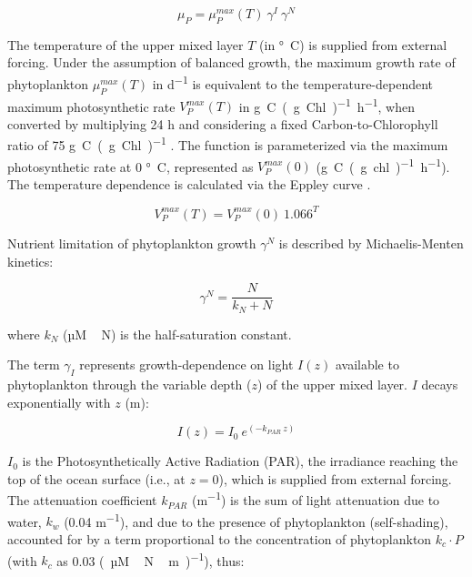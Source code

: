 \documentclass[gmd, manuscript]{copernicus}
\begin{document}
\begin{equation}
    \mu_{P} = \mu_P^{max}(T) \ \gamma^{I} \ \gamma^{N}
\end{equation}

The temperature of the upper mixed layer $T$ (in \unit{\degree C}) is supplied from external forcing. Under the assumption of balanced growth, the maximum growth rate of phytoplankton $\mu_P^{max}(T)$ in \unit{d^{−1}} is equivalent to the temperature-dependent maximum photosynthetic rate $V_P^{max}(T)$ in \unit{g C (g Chl)^{-1} h^{-1}}, when converted by multiplying 24 \unit{h} and considering a fixed Carbon-to-Chlorophyll ratio of 75 \unit{g C (g Chl)^{-1}} \citep{Sathyendranath2009Carbon-to-chlorophyllSea}. The function is parameterized via the maximum photosynthetic rate at 0 \unit{\degree C}, represented as $V_P^{max}(0)$ (\unit{g C (g chl)^{-1} h^{-1}}). The temperature dependence is calculated via the Eppley curve \citep{Eppley1972TemperatureSea}.

\begin{equation}
    V_P^{max}(T) = V_P^{max}(0) \ 1.066^T
\end{equation}

Nutrient limitation of phytoplankton growth $\gamma^N$ is described by Michaelis-Menten kinetics:

\begin{equation}
    \gamma^N = \frac{N}{k_N + N}
\end{equation}

where $k_N$ (\unit{µM\,N}) is the half-saturation constant.

The term $\gamma_{I}$ represents growth-dependence on light $I(z)$ available to phytoplankton through the variable depth ($z$) of the upper mixed layer. $I$ decays exponentially with $z$ (\unit{m}):

\begin{equation}
    I(z) = I_{0} \ e^{(-k_{PAR} \ z)}
\label{EQ:lightatt}
\end{equation}

$I_{0}$ is the Photosynthetically Active Radiation (PAR), the irradiance reaching the top of the ocean surface (i.e., at $z=0$), which is supplied from external forcing. The attenuation coefficient $k_{PAR}$ (\unit{m^{-1}}) is the sum of light attenuation due to water, $k_w$ (0.04 \unit{m^{-1}}), and due to the presence of phytoplankton (self-shading), accounted for by a term proportional to the concentration of phytoplankton $k_c \cdot P$ (with $k_c$ as 0.03 \unit{(µM\,N\,m)^{-1}}), thus:
\end{document}
